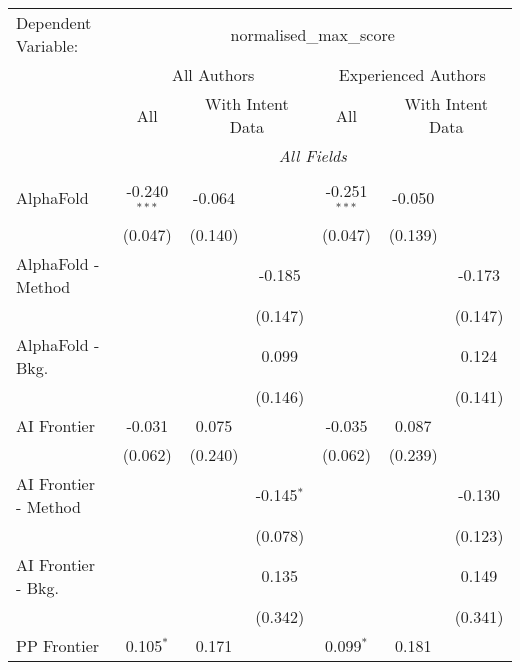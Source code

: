 \begingroup
\centering
\begin{tabular}{lcccccc}
   \tabularnewline \midrule \midrule
   Dependent Variable: & \multicolumn{6}{c}{normalised\_max\_score}\\
 & \multicolumn{3}{c}{All Authors} & \multicolumn{3}{c}{Experienced Authors} \\
\cmidrule(lr){2-4} \cmidrule(lr){5-7}
 & \multicolumn{1}{c}{All} & \multicolumn{2}{c}{With Intent Data} & \multicolumn{1}{c}{All} & \multicolumn{2}{c}{With Intent Data} \\
\cmidrule(lr){2-2} \cmidrule(lr){3-4} \cmidrule(lr){5-5} \cmidrule(lr){6-7}
 & \multicolumn{6}{c}{\textit{All Fields}} \\ \\
   AlphaFold            & -0.240$^{***}$ & -0.064  &              & -0.251$^{***}$ & -0.050  &   \\   
                        & (0.047)        & (0.140) &              & (0.047)        & (0.139) &   \\   
   AlphaFold - Method   &                &         & -0.185       &                &         & -0.173\\   
                        &                &         & (0.147)      &                &         & (0.147)\\   
   AlphaFold - Bkg.     &                &         & 0.099        &                &         & 0.124\\   
                        &                &         & (0.146)      &                &         & (0.141)\\   
   AI Frontier          & -0.031         & 0.075   &              & -0.035         & 0.087   &   \\   
                        & (0.062)        & (0.240) &              & (0.062)        & (0.239) &   \\   
   AI Frontier - Method &                &         & -0.145$^{*}$ &                &         & -0.130\\   
                        &                &         & (0.078)      &                &         & (0.123)\\   
   AI Frontier - Bkg.   &                &         & 0.135        &                &         & 0.149\\   
                        &                &         & (0.342)      &                &         & (0.341)\\   
   PP Frontier          & 0.105$^{*}$    & 0.171   &              & 0.099$^{*}$    & 0.181   &   \\   

\end{tabular}
